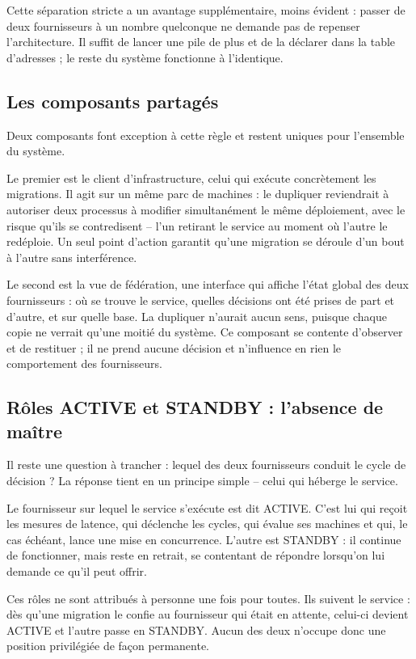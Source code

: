 Cette séparation stricte a un avantage supplémentaire, moins évident : passer de deux fournisseurs à un nombre quelconque ne demande pas de repenser l'architecture. Il suffit de lancer une pile de plus et de la déclarer dans la table d'adresses ; le reste du système fonctionne à l'identique.

\subsection{Les composants partagés}
Deux composants font exception à cette règle et restent uniques pour l'ensemble du système.

Le premier est le client d'infrastructure, celui qui exécute concrètement les migrations. Il agit sur un même parc de machines : le dupliquer reviendrait à autoriser deux processus à modifier simultanément le même déploiement, avec le risque qu'ils se contredisent -- l'un retirant le service au moment où l'autre le redéploie. Un seul point d'action garantit qu'une migration se déroule d'un bout à l'autre sans interférence.

Le second est la vue de fédération, une interface qui affiche l'état global des deux fournisseurs : où se trouve le service, quelles décisions ont été prises de part et d'autre, et sur quelle base. La dupliquer n'aurait aucun sens, puisque chaque copie ne verrait qu'une moitié du système. Ce composant se contente d'observer et de restituer ; il ne prend aucune décision et n'influence en rien le comportement des fournisseurs.

\subsection{Rôles ACTIVE et STANDBY : l'absence de maître}
Il reste une question à trancher : lequel des deux fournisseurs conduit le cycle de décision ? La réponse tient en un principe simple -- celui qui héberge le service.

Le fournisseur sur lequel le service s'exécute est dit ACTIVE. C'est lui qui reçoit les mesures de latence, qui déclenche les cycles, qui évalue ses machines et qui, le cas échéant, lance une mise en concurrence. L'autre est STANDBY : il continue de fonctionner, mais reste en retrait, se contentant de répondre lorsqu'on lui demande ce qu'il peut offrir.

Ces rôles ne sont attribués à personne une fois pour toutes. Ils suivent le service : dès qu'une migration le confie au fournisseur qui était en attente, celui-ci devient ACTIVE et l'autre passe en STANDBY. Aucun des deux n'occupe donc une position privilégiée de façon permanente.

